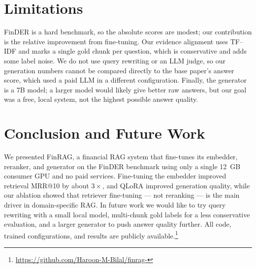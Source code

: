 \documentclass[conference]{IEEEtran}
\begin{document}
\section{Limitations}
FinDER is a hard benchmark, so the absolute scores are modest; our contribution is the relative
improvement from fine-tuning. Our evidence alignment uses TF--IDF and marks a single gold chunk per
question, which is conservative and adds some label noise. We do not use query rewriting or an LLM judge,
so our generation numbers cannot be compared directly to the base paper's answer score, which used a paid
LLM in a different configuration. Finally, the generator is a 7B model; a larger model would likely give
better raw answers, but our goal was a free, local system, not the highest possible answer quality.

\section{Conclusion and Future Work}
We presented FinRAG, a financial RAG system that fine-tunes its embedder, reranker, and generator on the
FinDER benchmark using only a single 12~GB consumer GPU and no paid services. Fine-tuning the embedder
improved retrieval MRR@10 by about $3\times$, and QLoRA improved generation quality, while our ablation
showed that retriever fine-tuning --- not reranking --- is the main driver in domain-specific RAG. In
future work we would like to try query rewriting with a small local model, multi-chunk gold labels for a
less conservative evaluation, and a larger generator to push answer quality further. All code, trained
configurations, and results are publicly available.\footnote{\url{https://github.com/Haroon-M-Bilal/finrag-}}
\end{document}
